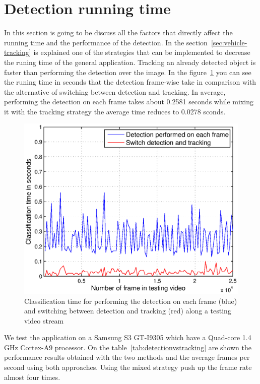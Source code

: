 
\section{Detection running time} %
\label{sec:running-time}

In this section is going to be discuss all the factors that directly affect the
running time and the performance of the detection. In the
section~\ref{sec:vehicle-tracking} is explained one of the strategies that can
be implemented to decrease the runing time of the general application. Tracking
an already detected object is faster than performing the detection over the
image. In the figure~\ref{fig:trackingvsdetection} you can see the runing time
in seconds that the detection frame-wise take in comparison with the alternative
of switching between detection and tracking. In average, performing the
detection on each frame takes about 0.2581 seconds while mixing it with the
tracking strategy the average time reduces to 0.0278 sconds.


\begin{figure}[h]
\centering
\includegraphics[width=\linewidth]{img/trackingvsdetection.eps}
\caption{Classification time for performing the detection on each
    frame (blue) and switching between detection and tracking (red) along a
    testing video stream}
\label{fig:trackingvsdetection}
\end{figure} 

We test the application on a Samsung S3 GT-I9305 which have a Quad-core 1.4 GHz
Cortex-A9 processor. On the table~\ref{tab:detectionvstracking} are shown the
performance results obtained with the two methods and the average frames per
second using both approaches. Using the mixed strategy push up the frame rate
almost four times.
 

